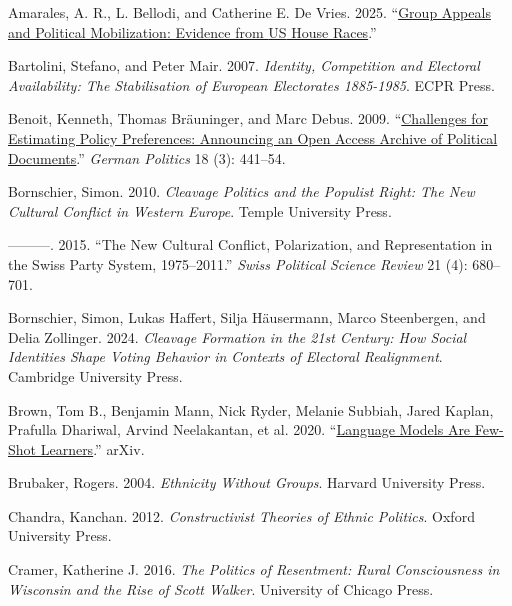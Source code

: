 \documentclass[12pt]{article}
\newlength{\cslhangindent}
\newenvironment{CSLReferences}[2]
  {\begin{list}{}{%
    \setlength{\itemindent}{0pt}
    \setlength{\leftmargin}{0pt}
    \setlength{\parsep}{0pt}
    \ifodd #1
      \setlength{\leftmargin}{\cslhangindent}
      \setlength{\itemindent}{-\cslhangindent}
    \fi
    \setlength{\itemsep}{#2\baselineskip}}}
  {\end{list}}
\begin{document}
\label{refs}
\begin{CSLReferences}{1}{0}
Amarales, A. R., L. Bellodi, and Catherine E. De Vries. 2025. {``\href{https://lucabellodi.com/material/group_appeals_mobilization_US.pdf}{Group Appeals and Political Mobilization: Evidence from {US} House Races}.''}

Bartolini, Stefano, and Peter Mair. 2007. \emph{Identity, Competition and Electoral Availability: The Stabilisation of European Electorates 1885-1985}. ECPR Press.

Benoit, Kenneth, Thomas Bräuninger, and Marc Debus. 2009. {``\href{https://doi.org/10.1080/09644000903055856}{Challenges for Estimating Policy Preferences: Announcing an Open Access Archive of Political Documents}.''} \emph{German Politics} 18 (3): 441--54.

Bornschier, Simon. 2010. \emph{Cleavage Politics and the Populist Right: The New Cultural Conflict in Western Europe}. Temple University Press.

---------. 2015. {``The New Cultural Conflict, Polarization, and Representation in the Swiss Party System, 1975--2011.''} \emph{Swiss Political Science Review} 21 (4): 680--701.

Bornschier, Simon, Lukas Haffert, Silja Häusermann, Marco Steenbergen, and Delia Zollinger. 2024. \emph{Cleavage Formation in the 21st Century: How Social Identities Shape Voting Behavior in Contexts of Electoral Realignment}. Cambridge University Press.

Brown, Tom B., Benjamin Mann, Nick Ryder, Melanie Subbiah, Jared Kaplan, Prafulla Dhariwal, Arvind Neelakantan, et al. 2020. {``\href{https://doi.org/10.48550/arXiv.2005.14165}{Language Models Are Few-Shot Learners}.''} {arXiv}.

Brubaker, Rogers. 2004. \emph{Ethnicity Without Groups}. Harvard University Press.

Chandra, Kanchan. 2012. \emph{Constructivist Theories of Ethnic Politics}. Oxford University Press.

Cramer, Katherine J. 2016. \emph{The Politics of Resentment: Rural Consciousness in Wisconsin and the Rise of Scott Walker}. University of Chicago Press.


\end{CSLReferences}
\end{document}
